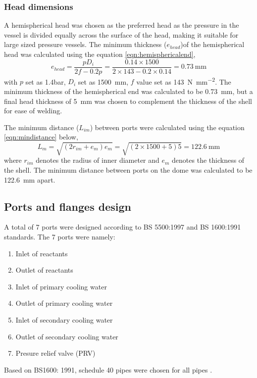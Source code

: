 \subsubsection{Head dimensions}
A hemispherical head was chosen as the preferred head as the pressure in the vessel is divided equally across the surface of the head, making it suitable for large sized pressure vessels. 
The minimum thickness ($e_{head}$)of the hemispherical head was calculated using the equation \ref{eqn:hemisphericalend},
\begin{equation}
    e_{head} = \frac{pD_i}{2f-0.2p} = \frac{0.14 \times 1500}{2 \times 143 - 0.2 \times 0.14} = \SI{0.73}{\mm}
    \label{eqn:hemisphericalend}
\end{equation}
with $p$ set as 1.4bar, $D_i$ set as \SI{1500}{\milli \metre}, $f$ value set as \SI{143}{\N\per\square\mm}.  The minimum thickness of the hemispherical end was calculated to be \SI{0.73}{\milli \metre}, but a final head thickness of \SI{5}{\milli \metre} was chosen to complement the thickness of the shell for ease of welding. 

The minimum distance ($L_{im}$) between ports were calculated using the equation \ref{eqn:mindistance} below,
\begin{equation}
    L_m = \sqrt{(2r_{im}+e_{m})e_m} = \sqrt{(2 \times 1500 + 5)5} = \SI{122.6}{\mm}
    \label{eqn:mindistance}
\end{equation}
where $r_{im}$ denotes the radius of inner diameter and $e_m$ denotes the thickness of the shell. The minimum distance between ports on the dome was calculated to be \SI{122.6}{\milli \metre} apart. 

\subsection{Ports and flanges design}
A total of 7 ports were designed according to BS 5500:1997 and BS 1600:1991 standards. The 7 ports were namely:
\begin{enumerate}
    \item Inlet of reactants
    \item Outlet of reactants
    \item Inlet of primary cooling water
    \item Outlet of primary cooling water
    \item Inlet of secondary cooling water
    \item Outlet of secondary cooling water
    \item Presure relief valve (PRV)
\end{enumerate}
Based on BS1600: 1991, schedule 40 pipes were chosen for all pipes \cite{noauthor_dimensions_nodate}. 
